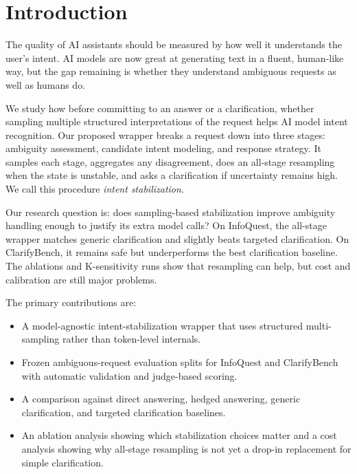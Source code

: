 \section{Introduction}



The quality of AI assistants should be measured by how well it understands the user's intent. AI models are now great at generating text in a fluent, human-like way, but the gap remaining is whether they understand ambiguous requests as well as humans do.

We study how before committing to an answer or a clarification, whether sampling multiple structured interpretations of the request helps AI model intent recognition. Our proposed wrapper breaks a request down into three stages: ambiguity assessment, candidate intent modeling, and response strategy. It samples each stage, aggregates any disagreement, does an all-stage resampling when the state is unstable, and asks a clarification if uncertainty remains high. We call this procedure \emph{intent stabilization}.

Our research question is: does sampling-based stabilization improve ambiguity handling enough to justify its extra model calls? On InfoQuest, the all-stage wrapper matches generic clarification and slightly beats targeted clarification. On ClarifyBench, it remains safe but underperforms the best clarification baseline. The ablations and K-sensitivity runs show that resampling can help, but cost and calibration are still major problems.


The primary contributions are:

\begin{itemize}

\item A model-agnostic intent-stabilization wrapper that uses structured multi-sampling rather than token-level internals.

\item Frozen ambiguous-request evaluation splits for InfoQuest and ClarifyBench with automatic validation and judge-based scoring.

\item A comparison against direct answering, hedged answering, generic clarification, and targeted clarification baselines.

\item An ablation analysis showing which stabilization choices matter and a cost analysis showing why all-stage resampling is not yet a drop-in replacement for simple clarification.

\end{itemize}
